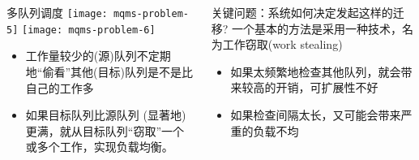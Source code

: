 \begin{frame}
	\begin{columns}
		\begin{column}{.5\textwidth}
			\Large \centering
			多队列调度
			\texttt{[image: mqms-problem-5]}
			\texttt{[image: mqms-problem-6]}	
			
			\normalsize
			
			\begin{itemize}
				\item 工作量较少的(源)队列不定期地“偷看”其他(目标)队列是不是比自己的工作多
				\item 如果目标队列比源队列 (显著地)更满，就从目标队列“窃取”一个或多个工作，实现负载均衡。
				
			\end{itemize}

		
		\end{column}
		
		\begin{column}{.5\textwidth}
			\begin{block}{关键问题：系统如何决定发起这样的迁移?}
				一个基本的方法是采用一种技术，名为工作窃取(work stealing)
			\end{block} 
			\pause
			\normalsize
		
			\begin{itemize}
				\item 如果太频繁地检查其他队列，就会带来较高的开销，可扩展性不好
				\item 如果检查间隔太长，又可能会带来严重的负载不均
			\end{itemize}

			
		\end{column}
	\end{columns}
\end{frame}






